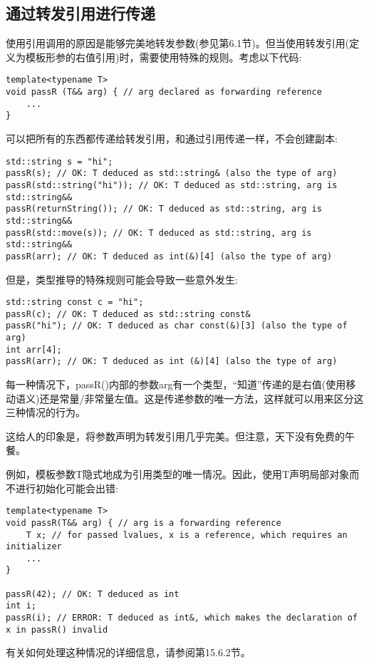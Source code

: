 \subsection{通过转发引用进行传递}

使用引用调用的原因是能够完美地转发参数(参见第6.1节)。但当使用转发引用(定义为模板形参的右值引用)时，需要使用特殊的规则。考虑以下代码:

\begin{lstlisting}[style=styleCXX]
template<typename T>
void passR (T&& arg) { // arg declared as forwarding reference
	...
}
\end{lstlisting}

可以把所有的东西都传递给转发引用，和通过引用传递一样，不会创建副本:

\begin{lstlisting}[style=styleCXX]
std::string s = "hi";
passR(s); // OK: T deduced as std::string& (also the type of arg)
passR(std::string("hi")); // OK: T deduced as std::string, arg is std::string&&
passR(returnString()); // OK: T deduced as std::string, arg is std::string&&
passR(std::move(s)); // OK: T deduced as std::string, arg is std::string&&
passR(arr); // OK: T deduced as int(&)[4] (also the type of arg)
\end{lstlisting}

但是，类型推导的特殊规则可能会导致一些意外发生:

\begin{lstlisting}[style=styleCXX]
std::string const c = "hi";
passR(c); // OK: T deduced as std::string const&
passR("hi"); // OK: T deduced as char const(&)[3] (also the type of arg)
int arr[4];
passR(arr); // OK: T deduced as int (&)[4] (also the type of arg)
\end{lstlisting}

每一种情况下，passR()内部的参数arg有一个类型，“知道”传递的是右值(使用移动语义)还是常量/非常量左值。这是传递参数的唯一方法，这样就可以用来区分这三种情况的行为。

这给人的印象是，将参数声明为转发引用几乎完美。但注意，天下没有免费的午餐。

例如，模板参数T隐式地成为引用类型的唯一情况。因此，使用T声明局部对象而不进行初始化可能会出错:

\begin{lstlisting}[style=styleCXX]
template<typename T>
void passR(T&& arg) { // arg is a forwarding reference
	T x; // for passed lvalues, x is a reference, which requires an initializer
	...
}

passR(42); // OK: T deduced as int
int i;
passR(i); // ERROR: T deduced as int&, which makes the declaration of x in passR() invalid
\end{lstlisting}

有关如何处理这种情况的详细信息，请参阅第15.6.2节。





















